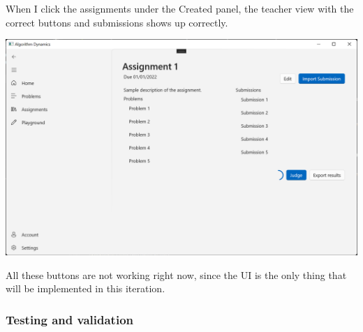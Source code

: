 \documentclass[a4paper]{report}
\begin{document}
When I click the assignments under the Created panel, the teacher view with the correct buttons and submissions shows up correctly.

\includegraphics[width=\textwidth, height=\textheight, keepaspectratio]{AssignmentDetailsPage-Teacher}

All these buttons are not working right now, since the UI is the only thing that will be implemented in this iteration.

\subsubsection{Testing and validation}
\end{document}

